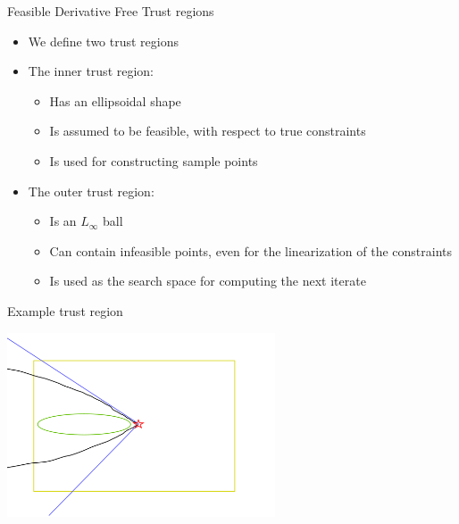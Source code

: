 \documentclass{beamer}
\begin{document}
\begin{frame}{Feasible Derivative Free Trust regions}
    \begin{itemize}
        \item We define two trust regions
        \item The inner trust region:
            \begin{itemize}
                \item Has an ellipsoidal shape
                \item Is assumed to be feasible, with respect to true constraints
                \item Is used for constructing sample points
            \end{itemize}
        \item The outer trust region:
            \begin{itemize}
                \item Is an $L_{\infty}$ ball
                \item Can contain infeasible points, even for the linearization of the constraints
                \item Is used as the search space for computing the next iterate
            \end{itemize}
    \end{itemize}
\end{frame}


\begin{frame}{Example trust region}
\begin{center}
    \includegraphics[width=300px]{images/trust_regions.png}
\end{center}
\end{frame}
\end{document}
